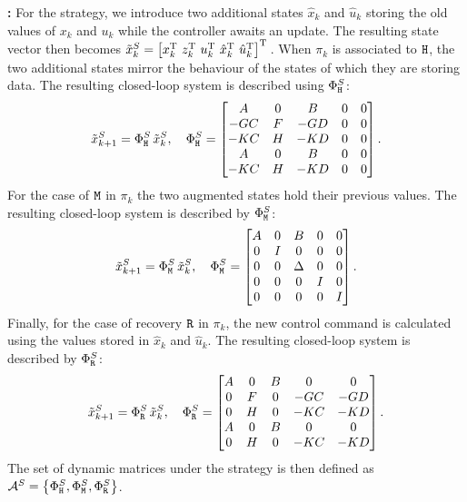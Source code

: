 \textbf{\tS{}: }%
%
For the \tS{} strategy, we introduce two additional states $\hat x_k$ and $\hat u_k$ storing the old values of $x_k$ and $u_k$ while the controller awaits an update.
The resulting state vector then becomes $\tilde x_k^{S} = \left[ x_k^{\mathrm{\small{T}}}{}\,\,z_k^{\mathrm{\small{T}}}{}\,\, u_k^{\mathrm{\small{T}}}{}\,\, \hat{x}_k^{\mathrm{\small{T}}}{}\,\, \hat{u}_k^{\mathrm{\small{T}}}{} \right]^{\mathrm{\small{T}}}{}$.
When $\pi_k$ is associated to $\texttt{H}$, the two additional states mirror the behaviour of the states of which they are storing data.
The resulting closed-loop system is described using $\Phi{}^{S}_{\texttt{H}}$:
%
\begin{equation*}
    \tilde x_{k+1}^{S} = \Phi{}^{S}_{\texttt{H}}\,\tilde x_k^{S}, \quad
    \Phi{}^{S}_{\texttt{H}} = \begin{bmatrix}
        A       & 0    & B      & 0 & 0 \\
        -GC   & F  & -GD  & 0 & 0 \\
        -KC   & H  & -KD  & 0 & 0 \\
        A       & 0    & B      & 0 & 0 \\
        -KC   & H  & -KD  & 0 & 0 \\
    \end{bmatrix}.
\end{equation*}
%
For the case of $\texttt{M}$ in $\pi_k$ the two augmented states hold their previous values.
The resulting closed-loop system is described by $\Phi{}^{S}_{\texttt{M}}$:
%
\begin{equation*}
    \tilde x_{k+1}^{S} = \Phi{}^{S}_{\texttt{M}}\,\tilde x_k^{S}, \quad
    \Phi{}^{S}_{\texttt{M}}=\begin{bmatrix}
        A & 0  & B & 0 & 0 \\
        0   & I  & 0   & 0 & 0 \\
        0   & 0  & \Delta   & 0 & 0 \\
        0   & 0  & 0   & I & 0 \\
        0   & 0  & 0   & 0 & I \\
    \end{bmatrix}.
\end{equation*}
%
Finally, for the case of recovery $\texttt{R}$ in $\pi_k$, the new control command is calculated using the values stored in $\hat x_k$ and $\hat u_k$.
The resulting closed-loop system is described by $\Phi{}^{S}_{\texttt{R}}$:
%
\begin{equation*}
    \tilde x_{k+1}^{S} = \Phi{}^{S}_{\texttt{R}} \, \tilde x_{k}^{S}, \quad
    \Phi{}^{S}_{\texttt{R}} = \begin{bmatrix}
        A & 0    & B & 0       & 0 \\
        0   & F  & 0   & -GC & -GD \\
        0   & H  & 0   & -KC & -KD \\
        A & 0    & B & 0       & 0 \\
        0   & H  & 0   & -KC & -KD \\
    \end{bmatrix}.
\end{equation*}
%
The set of dynamic matrices under the \tS{} strategy is then defined as $\mathcal{A}^{S}=\left\{\Phi{}^{S}_{\texttt{H}},\Phi{}^{S}_{\texttt{M}},\Phi{}^{S}_{\texttt{R}}\right\}$.

